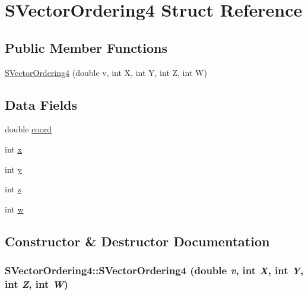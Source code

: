 \hypertarget{structSVectorOrdering4}{
\section{SVectorOrdering4 Struct Reference}
\label{structSVectorOrdering4}
}
\subsection*{Public Member Functions}
\begin{DoxyCompactItemize}
\item 
\hyperlink{structSVectorOrdering4_a1ebb8115284fa3c690b8a7237384e360}{SVectorOrdering4} (double v, int X, int Y, int Z, int W)
\end{DoxyCompactItemize}
\subsection*{Data Fields}
\begin{DoxyCompactItemize}
\item 
double \hyperlink{structSVectorOrdering4_aaeaa6fd9fda9cf73a981a1d9e443c13b}{coord}
\item 
int \hyperlink{structSVectorOrdering4_aaaf19eb8fdb1c6ae540c2496e6053f67}{x}
\item 
int \hyperlink{structSVectorOrdering4_a4b3999f70688bfcded7e15105e8446bc}{y}
\item 
int \hyperlink{structSVectorOrdering4_aa0df102e7f74b1cf5c38953cdd0c7bef}{z}
\item 
int \hyperlink{structSVectorOrdering4_a40e736f8e2ff933b04618360bf6ca3c2}{w}
\end{DoxyCompactItemize}


\subsection{Constructor \& Destructor Documentation}
\hypertarget{structSVectorOrdering4_a1ebb8115284fa3c690b8a7237384e360}{
\subsubsection[{SVectorOrdering4}]{\setlength{\rightskip}{0pt plus 5cm}SVectorOrdering4::SVectorOrdering4 (double {\em v}, \/  int {\em X}, \/  int {\em Y}, \/  int {\em Z}, \/  int {\em W})}}
\label{structSVectorOrdering4_a1ebb8115284fa3c690b8a7237384e360}


